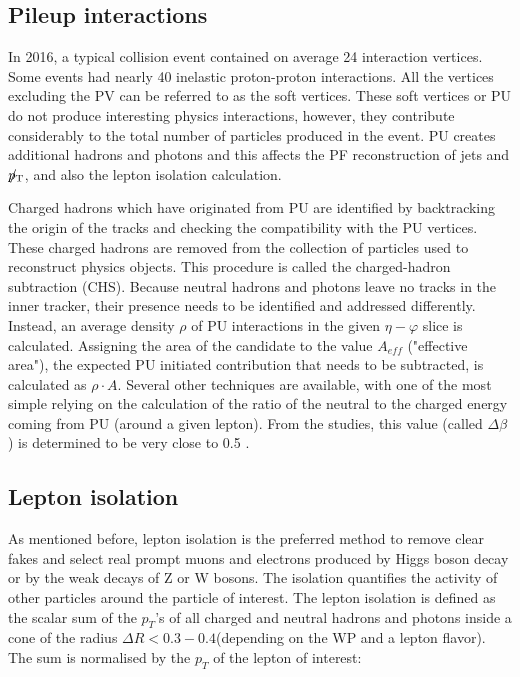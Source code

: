 \subsection{Pileup interactions}\label{sec:pileup}

In 2016, a typical collision event contained on average 24 interaction vertices. Some events had nearly 40 inelastic proton-proton interactions. All the vertices excluding the PV can be referred to as the soft vertices. These soft vertices or PU do not produce interesting physics interactions, however, they contribute considerably to the total number of particles produced in the event. PU creates additional hadrons and photons and this affects the PF reconstruction of jets and ${p}_\mathrm{T}\hspace{-1.02em}/\kern 0.5em$, and also the lepton isolation calculation.

Charged hadrons which have originated from PU are identified by backtracking the origin of the tracks and checking the compatibility with the PU vertices. These charged hadrons are removed from the collection of particles used to reconstruct physics objects. This procedure is called the charged-hadron subtraction (CHS). Because neutral hadrons and photons leave no tracks in the inner tracker, their presence needs to be identified and addressed differently. Instead, an average density $\rho$ of PU interactions in the given $\eta - \varphi$ slice is calculated. Assigning the area of the candidate to the value $A_{eff}$ ("effective area"), the expected PU initiated contribution that needs to be subtracted, is calculated as $\rho \cdot A$. Several other techniques are available, with one of the most simple relying on the calculation of the ratio of the neutral to the charged energy coming from PU (around a given lepton). From the studies, this value (called $\Delta \beta$) is determined to be very close to 0.5 \cite{PU_mitigation}. 

\subsection{Lepton isolation}\label{sec:isolation}

As mentioned before, lepton isolation is the preferred method to remove clear fakes and select real  prompt  muons  and  electrons  produced  by Higgs boson decay or by the weak decays of Z or W bosons. The isolation quantifies the activity of other particles around the particle of interest. The lepton isolation is defined as the scalar sum of the $p_T$'s of all charged and neutral hadrons and photons inside a cone of the radius $\Delta R <  0.3 - 0.4 $(depending on the WP and a lepton flavor). The sum is normalised by the $p_T$ of the lepton of interest:

